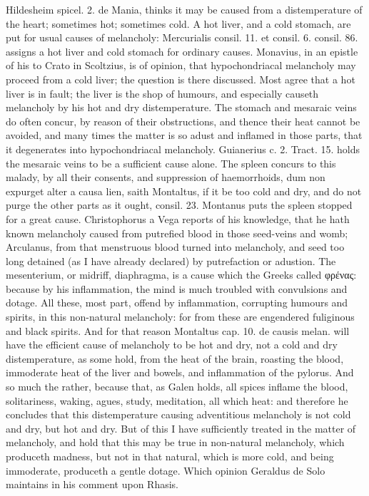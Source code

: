 {Hildesheim spicel. 2. de Mania, thinks it may be caused from a 
distemperature of the heart; sometimes hot; sometimes cold. A hot
liver, and a cold stomach, are put for usual causes of melancholy:
Mercurialis consil. 11. et consil. 6. consil. 86. assigns a hot liver
and cold stomach for ordinary causes. Monavius, in an epistle of
his to Crato in Scoltzius, is of opinion, that hypochondriacal
melancholy may proceed from a cold liver; the question is there
discussed. Most agree that a hot liver is in fault; the liver is
the shop of humours, and especially causeth melancholy by his hot and
dry distemperature. The stomach and mesaraic veins do often
concur, by reason of their obstructions, and thence their heat cannot
be avoided, and many times the matter is so adust and inflamed in those
parts, that it degenerates into hypochondriacal melancholy. Guianerius
c. 2. Tract. 15. holds the mesaraic veins to be a sufficient
cause alone. The spleen concurs to this malady, by all their
consents, and suppression of haemorrhoids, dum non expurget alter a
causa lien, saith Montaltus, if it be too cold and dry, and do
not purge the other parts as it ought, consil. 23. Montanus puts the
 spleen stopped for a great cause. Christophorus a Vega
reports of his knowledge, that he hath known melancholy caused from
putrefied blood in those seed-veins and womb; Arculanus, from
that menstruous blood turned into melancholy, and seed too long
detained (as I have already declared) by putrefaction or adustion.
The mesenterium, or midriff, diaphragma, is a cause which the
Greeks called \textgreek{φρένας}: because by his inflammation, the mind is
much troubled with convulsions and dotage. All these, most part, offend
by inflammation, corrupting humours and spirits, in this non-natural
melancholy: for from these are engendered fuliginous and black spirits.
And for that reason Montaltus cap. 10. de causis melan. will have
the efficient cause of melancholy to be hot and dry, not a cold and dry
distemperature, as some hold, from the heat of the brain, roasting the
blood, immoderate heat of the liver and bowels, and inflammation of the
pylorus. And so much the rather, because that, as Galen holds, all
spices inflame the blood, solitariness, waking, agues, study,
meditation, all which heat: and therefore he concludes that this
distemperature causing adventitious melancholy is not cold and dry, but
hot and dry. But of this I have sufficiently treated in the matter of
melancholy, and hold that this may be true in non-natural melancholy,
which produceth madness, but not in that natural, which is more cold,
and being immoderate, produceth a gentle dotage. Which opinion
Geraldus de Solo maintains in his comment upon Rhasis.

}
